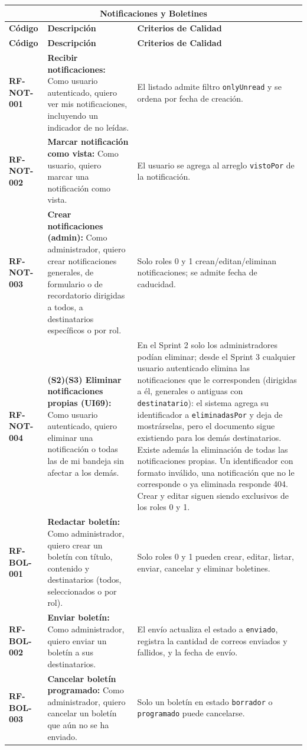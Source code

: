 \begin{longtable}{|l||p{7cm}|p{4.5cm}|}

\multicolumn{3}{c}{Notificaciones y Boletines}\\
\hline\hline
\textbf{Código} & \textbf{Descripción} & \textbf{Criterios de Calidad}\\
\hline
\endfirsthead
\textbf{Código} & \textbf{Descripción} & \textbf{Criterios de Calidad}\\
\hline\hline
\endhead

\textbf{RF-NOT-001} & \textbf{Recibir notificaciones:} Como usuario autenticado, quiero ver mis notificaciones, incluyendo un indicador de no leídas. & El listado admite filtro \texttt{onlyUnread} y se ordena por fecha de creación. \\
\hline
\textbf{RF-NOT-002} & \textbf{Marcar notificación como vista:} Como usuario, quiero marcar una notificación como vista. & El usuario se agrega al arreglo \texttt{vistoPor} de la notificación. \\
\hline
\textbf{RF-NOT-003} & \textbf{Crear notificaciones (admin):} Como administrador, quiero crear notificaciones generales, de formulario o de recordatorio dirigidas a todos, a destinatarios específicos o por rol. & Solo roles 0 y 1 crean/editan/eliminan notificaciones; se admite fecha de caducidad. \\
\hline
\textbf{RF-NOT-004} & \textbf{(S2)(S3) Eliminar notificaciones propias (UI69):} Como usuario autenticado, quiero eliminar una notificación o todas las de mi bandeja sin afectar a los demás. & En el Sprint 2 solo los administradores podían eliminar; desde el Sprint 3 cualquier usuario autenticado elimina las notificaciones que le corresponden (dirigidas a él, generales o antiguas con \texttt{destinatario}): el sistema agrega su identificador a \texttt{eliminadasPor} y deja de mostrárselas, pero el documento sigue existiendo para los demás destinatarios. Existe además la eliminación de todas las notificaciones propias. Un identificador con formato inválido, una notificación que no le corresponde o ya eliminada responde 404. Crear y editar siguen siendo exclusivos de los roles 0 y 1. \\
\hline
\textbf{RF-BOL-001} & \textbf{Redactar boletín:} Como administrador, quiero crear un boletín con título, contenido y destinatarios (todos, seleccionados o por rol). & Solo roles 0 y 1 pueden crear, editar, listar, enviar, cancelar y eliminar boletines. \\
\hline
\textbf{RF-BOL-002} & \textbf{Enviar boletín:} Como administrador, quiero enviar un boletín a sus destinatarios. & El envío actualiza el estado a \texttt{enviado}, registra la cantidad de correos enviados y fallidos, y la fecha de envío. \\
\hline
\textbf{RF-BOL-003} & \textbf{Cancelar boletín programado:} Como administrador, quiero cancelar un boletín que aún no se ha enviado. & Solo un boletín en estado \texttt{borrador} o \texttt{programado} puede cancelarse. \\
\hline
\end{longtable}

